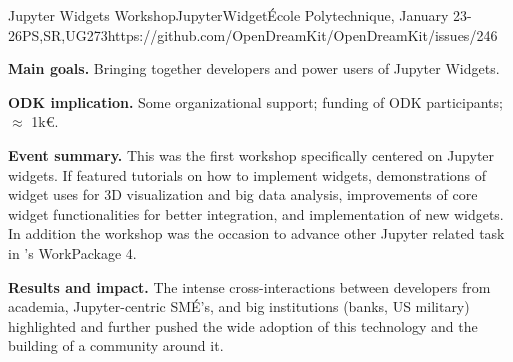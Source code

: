 \begin{event}{Jupyter Widgets Workshop}{JupyterWidget}{École Polytechnique, January 23-26}{PS,SR,UG}{27}{3}{https://github.com/OpenDreamKit/OpenDreamKit/issues/246}

\textbf{Main goals.} Bringing together developers and power users of Jupyter Widgets.

\textbf{ODK implication.} Some organizational support; funding of ODK participants; $\approx$ 1k\euro.

\textbf{Event summary.} This was the first workshop specifically
centered on Jupyter widgets. If featured tutorials on how to implement
widgets, demonstrations of widget uses for 3D visualization and big
data analysis, improvements of core widget functionalities for better
integration, and implementation of new widgets. In addition the
workshop was the occasion to advance other Jupyter related task in
\ODK's WorkPackage 4.

\textbf{Results and impact.} The intense cross-interactions between
developers from academia, Jupyter-centric SMÉ's, and big institutions
(banks, US military) highlighted and further pushed the wide adoption
of this technology and the building of a community around it.
\end{event}
